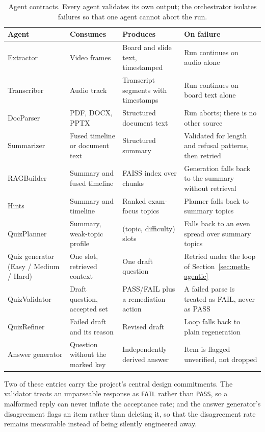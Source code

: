 \begin{table}[H]
\centering
\caption{Agent contracts. Every agent validates its own output; the orchestrator
isolates failures so that one agent cannot abort the run.}
\label{tab:agents}
\footnotesize
\setlength{\tabcolsep}{4pt}
\begin{tabular}{|p{2.5cm}|p{3.1cm}|p{3.1cm}|p{4.0cm}|}
\hline
\textbf{Agent} & \textbf{Consumes} & \textbf{Produces} & \textbf{On failure} \\
\hline
Extractor & Video frames & Board and slide text, timestamped &
Run continues on audio alone \\
\hline
Transcriber & Audio track & Transcript segments with timestamps &
Run continues on board text alone \\
\hline
DocParser & PDF, DOCX, PPTX & Structured document text &
Run aborts; there is no other source \\
\hline
Summarizer & Fused timeline or document text & Structured summary &
Validated for length and refusal patterns, then retried \\
\hline
RAGBuilder & Summary and fused timeline & FAISS index over chunks &
Generation falls back to the summary without retrieval \\
\hline
Hints & Summary and timeline & Ranked exam-focus topics &
Planner falls back to summary topics \\
\hline
QuizPlanner & Summary, weak-topic profile & (topic, difficulty) slots &
Falls back to an even spread over summary topics \\
\hline
Quiz generator (Easy / Medium / Hard) & One slot, retrieved context &
One draft question & Retried under the loop of
Section~\ref{sec:meth-agentic} \\
\hline
QuizValidator & Draft question, accepted set & PASS/FAIL plus a remediation
action & A failed parse is treated as FAIL, never as PASS \\
\hline
QuizRefiner & Failed draft and its reason & Revised draft &
Loop falls back to plain regeneration \\
\hline
Answer generator & Question without the marked key & Independently derived
answer & Item is flagged unverified, not dropped \\
\hline
\end{tabular}
\end{table}

Two of these entries carry the project's central design commitments. The
validator treats an unparseable response as \texttt{FAIL} rather than
\texttt{PASS}, so a malformed reply can never inflate the acceptance rate; and
the answer generator's disagreement flags an item rather than deleting it, so
that the disagreement rate remains measurable instead of being silently
engineered away.

